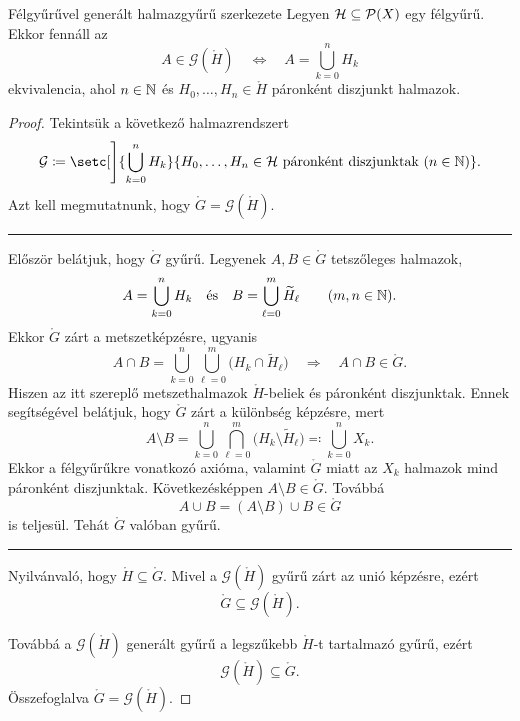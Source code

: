 \documentclass[
]{elteikthesis}[2024/04/26]
\begin{document}
	\begin{lemma}{Félgyűrűvel generált halmazgyűrű szerkezete}{}
		Legyen \( \mathcal{H} \subseteq \mathcal{P}( X ) \) egy félgyűrű. Ekkor fennáll az
		\[
			A \in \mathcal{G}(\ring{H})
			\quad \iff \quad
			A = \bigcup_{k=0}^n H_k
		\]
		ekvivalencia, 
		ahol \( n \in \mathbb{N} \) és \( H_0, \dots, H_n \in \ring{H} \) páronként diszjunkt halmazok.
	\end{lemma}
	\begin{proof}
		Tekintsük a következő halmazrendszert
		\[
			\ring{G} \coloneq 
			\setc[\Bigg]{ \bigcup_{k=0}^n H_k }
			            { H_0, \dots, H_n \in \ring{H} \text{ páronként diszjunktak} \ (n \in \N)}.
		\]
		Azt kell megmutatnunk, hogy \( \ring{G} = \mathcal{G}(\ring{H}) \).
		
		\vspace{6pt}
		\hrule
		\vspace{6pt}
		
		Először belátjuk, hogy \( \ring{G} \) gyűrű.
		Legyenek \( A, B \in \ring{G} \) tetszőleges halmazok,
		\[
			A = \bigcup_{k=0}^n H_k 
			\quad \text{és} \quad
			B = \bigcup_{\ell=0}^m \widetilde{H}_\ell
			\qquad (m, n \in \mathbb{N}).
		\]
		Ekkor \( \ring{G} \) zárt a metszetképzésre, ugyanis
		\[
			A \cap B = 
			\bigcup_{k=0}^n \bigcup_{\ell=0}^m \bigl( H_k \cap \widetilde{H}_\ell \bigr)
			\quad \Longrightarrow \quad
			A \cap B \in \ring{G}.
		\]
		Hiszen az itt szereplő metszethalmazok \( \ring{H} \)-beliek és páronként diszjunktak.
		Ennek segítségével belátjuk, hogy \( \ring{G} \) zárt a különbség képzésre, mert
		\[
			A \setminus B = 
			\bigcup_{k=0}^n \bigcap_{\ell=0}^m \bigl( H_k \setminus \widetilde{H}_\ell \bigr)
			\eqcolon \bigcup_{k=0}^n X_k.
		\]
		Ekkor a félgyűrűkre vonatkozó axióma, valamint \( \ring{G} \) miatt az \( X_k \) halmazok mind páronként diszjunktak. Következésképpen \( A \setminus B \in \ring{G} \).
		Továbbá
		\[
			A \cup B = (A \setminus B) \cup B \in \ring{G}
		\]
		is teljesül. Tehát \( \ring{G} \) valóban gyűrű.
		
		\vspace{6pt}
		\hrule
		\vspace{6pt}
		
		Nyilvánvaló, hogy \( \ring{H} \subseteq \ring{G} \).
		Mivel a \( \mathcal{G}(\ring{H}) \) gyűrű zárt az unió képzésre, ezért
		\[
			\ring{G} \subseteq \mathcal{G}(\ring{H}).
		\]
		
		Továbbá a \( \mathcal{G}(\ring{H}) \) generált gyűrű a legszűkebb \( \ring{H} \)-t 
		tartalmazó gyűrű, ezért 
		\[
			\mathcal{G}(\ring{H}) \subseteq \ring{G}.
		\]
		Összefoglalva \( \ring{G} = \mathcal{G}(\ring{H}) \).
	\end{proof}
	
\end{document}
